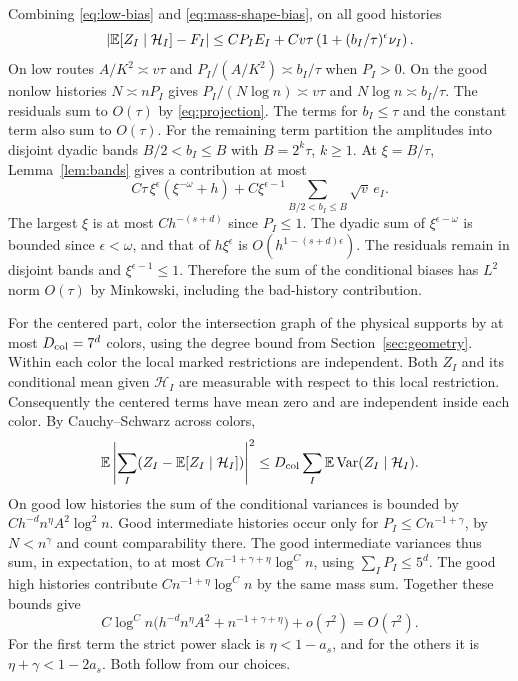 Combining \eqref{eq:low-bias} and
\eqref{eq:mass-shape-bias}, on all good histories
\begin{equation}\label{eq:per-cell}
 \left|\mathbb E[Z_I\mid\mathcal H_I]-F_I\right|
 \le C P_I E_I+ C v\tau\left(1+(b_I/\tau)^\epsilon
                                 \nu_I\right).
\end{equation}
On low routes \(A/K^2\asymp v\tau\) and
\(P_I/(A/K^2)\asymp b_I/\tau\) when \(P_I>0\).
On the good nonlow histories \(N\asymp nP_I\) gives
\(P_I/(N\log n)\asymp v\tau\) and \(N\log n\asymp b_I/\tau\).
The residuals sum to \(O(\tau)\) by \eqref{eq:projection}.
The terms for \(b_I\le\tau\) and the constant term
also sum to \(O(\tau)\). For the remaining term partition
the amplitudes into disjoint dyadic bands
\(B/2<b_I\le B\) with \(B=2^k\tau\), \(k\ge1\).
At \(\xi=B/\tau\), Lemma~\ref{lem:bands} gives
a contribution at most
\[
 C\tau\,\xi^\epsilon(\xi^{-\omega}+h)
       +C \xi^{\epsilon-1}\sum_{B/2<b_I\le B}\sqrt v\,e_I .
\]
The largest \(\xi\) is at most \(C h^{-(s+d)}\)
since \(P_I\le1\). The dyadic sum of \(\xi^{\epsilon-\omega}\)
is bounded since \(\epsilon<\omega\), and that of
\(h\xi^\epsilon\) is \(O(h^{1-(s+d)\epsilon})\). The residuals remain in disjoint
bands and \(\xi^{\epsilon-1}\le1\). Therefore the sum of the
conditional biases has \(L^2\) norm \(O(\tau)\) by Minkowski,
including the bad-history contribution.

For the centered part, color the intersection graph of the
physical supports by at most \(D_{\rm col}=7^d\) colors,
using the degree bound from Section~\ref{sec:geometry}.
Within each color the local marked restrictions are independent.
Both \(Z_I\) and its conditional mean given \(\mathcal H_I\)
are measurable with respect to this local restriction.
Consequently the centered terms have mean zero and are
independent inside each color. By Cauchy--Schwarz across colors,
\[
 \mathbb E\left|\sum_I (Z_I-\mathbb E[Z_I\mid\mathcal H_I])\right|^2
 \le D_{\rm col}\sum_I \mathbb E\operatorname{Var}(Z_I\mid\mathcal H_I).
\]
On good low histories the sum of the conditional variances is
bounded by \(C h^{-d} n^\eta A^2\log^2 n\). Good intermediate
histories occur only for \(P_I\le C n^{-1+\gamma}\),
by \(N<n^\gamma\) and count comparability there.
The good intermediate variances thus sum, in expectation,
to at most \(C n^{-1+\gamma+\eta}\log^C n\),
using \(\sum_I P_I\le5^d\).
The good high histories contribute
\(C n^{-1+\eta}\log^C n\) by the same mass sum.
Together these bounds give
\[
 C\log^C n\bigl(h^{-d}n^\eta A^2+n^{-1+\gamma+\eta}\bigr)
   +o(\tau^2)=O(\tau^2).
\]
For the first term the strict power slack is
\(\eta<1-a_s\), and for the others it is
\(\eta+\gamma<1-2a_s\). Both follow from our choices.

